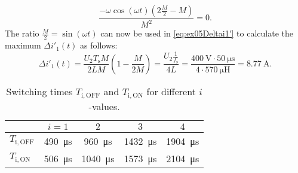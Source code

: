 \begin{solutionblock}
    \begin{equation}
        \frac{-\omega \cos(\omega t)(2 \frac{M}{2}-M)}{M^2}=0.
    \end{equation}
    The ratio $\frac{M}{2}=\sin(\omega t)$ can now be used in \eqref{eq:ex05Deltai1'} to calculate the maximum $\Delta i'_{\mathrm{1}}(t)$ as follows:
    \begin{equation}
        \Delta i'_{\mathrm{1}}(t) = \frac{U_{\mathrm{2}}T_{\mathrm{s}}M}{2LM}\left(1-\frac{M}{2M}\right) = \frac{U_{\mathrm{2}}\frac{1}{f_\mathrm{s}}}{4L}=\frac{\SI{400}{\volt}\cdot \SI{50}{\micro\s}}{4\cdot\SI{570}{\micro\henry}} = \SI{8.77}{\ampere}.
    \end{equation}
\end{solutionblock}


\begin{table}[ht]
    \centering
    
    \begin{tabular}{lcccc}
        \toprule
        & $i = 1$ & $2$ & $3$ & $4$ \\
        \midrule
       $T_\mathrm{i,OFF}$& \SI{490}{\micro\second} & \SI{960}{\micro\second} & \SI{1432}{\micro\second} & \SI{1904}{\micro\second} \\
        $T_\mathrm{i,ON}$  & \SI{506}{\micro\second} & \SI{1040}{\micro\second} & \SI{1573}{\micro\second} & \SI{2104}{\micro\second} \\
        \bottomrule
    \end{tabular}
    \caption{Switching times $T_\mathrm{i,OFF}$ and $T_\mathrm{i,ON}$ for different $i$-values.}
    \label{tab:switching_times}
\end{table}

